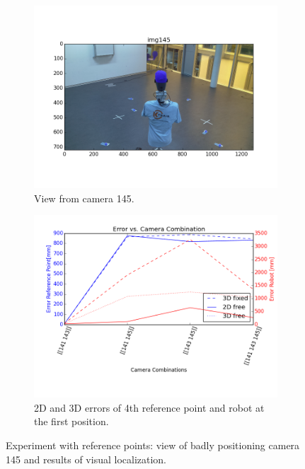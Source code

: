 \begin{figure}
    \centering
    \begin{subfigure}{0.49\linewidth}
        \centering
        \includegraphics[width=\linewidth]{files/res1_img145.png}
        \caption{View from camera 145.}
        \label{fig:res1_img145}
    \end{subfigure}
    \begin{subfigure}{0.49\linewidth}
        \centering
        \includegraphics[width=\linewidth]{files/res1_combi_4.png}
        \caption{2D and 3D errors of 4th reference point and robot at the first position.}
        \label{fig:res1_combi}
    \end{subfigure}
    \caption{Experiment with reference points: view of badly positioning camera 145 and results of visual localization.}
    \label{fig:experiment1}
\end{figure}




